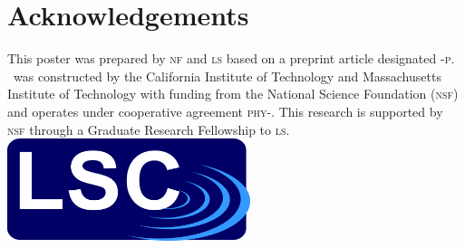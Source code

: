 \documentclass[portrait,plainboxedsections]{sciposter}
\begin{document}
\begin{minipage}[t]{0.25\textwidth}


\end{minipage}%
\hspace{0.05\textwidth}%
\begin{minipage}[t]{0.7\textwidth}
\section*{Acknowledgements}

This poster was prepared by \textsc{nf} and \textsc{ls} based on a preprint
article designated \LIGO{}-\textsc{p}. \LIGO\ was constructed by the California Institute of
Technology and Massachusetts Institute of Technology with funding from the
National Science Foundation (\textsc{nsf}) and operates under cooperative agreement
\textsc{phy}-. This research is supported by \textsc{nsf}
through a Graduate Research Fellowship to \textsc{ls}. \\
\newline\newline
\includegraphics[height=3cm]{figures/LSC_logo}\hspace{7.5mm}
\hspace{7.5mm}

\end{minipage}
\end{document}
